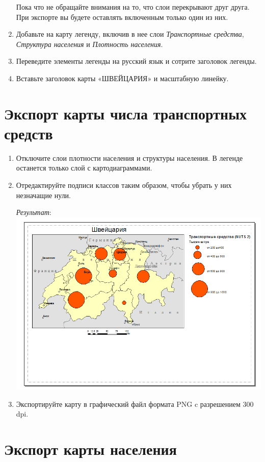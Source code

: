 \documentclass[]{book}
\theoremstyle{definition}
\theoremstyle{definition}
\theoremstyle{definition}
\theoremstyle{remark}
\begin{document}
\begin{enumerate}
  Пока что не обращайте внимания на то, что слои перекрывают друг друга.
  При экспорте вы будете оставлять включенным только один из них.
\item
  Добавьте на карту легенду, включив в нее слои \emph{Транспортные
  средства}, \emph{Структура населения} и \emph{Плотность населения}.
\item
  Переведите элементы легенды на русский язык и сотрите заголовок
  легенды.
\item
  Вставьте заголовок карты «ШВЕЙЦАРИЯ» и масштабную линейку.
\end{enumerate}

\hypertarget{stat-map-economic-export-transport}{%
\section{Экспорт карты числа транспортных
средств}\label{stat-map-economic-export-transport}}

\begin{enumerate}
\def\labelenumi{\arabic{enumi}.}
\item
  Отключите слои плотности населения и структуры населения. В легенде
  останется только слой с картодиаграммами.
\item
  Отредактируйте подписи классов таким образом, чтобы убрать у них
  незначащие нули.

  \emph{Результат}: \includegraphics{images/Ex08/image33.png}
\item
  Экспортируйте карту в графический файл формата PNG c разрешением 300
  dpi.
\end{enumerate}

\hypertarget{stat-map-economic-export-population}{%
\section{Экспорт карты
населения}\label{stat-map-economic-export-population}}
\end{document}
